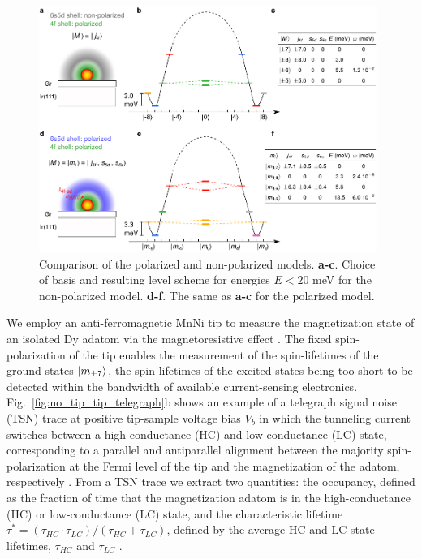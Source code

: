 \documentclass[
reprint,amsmath,amssymb,aps]{revtex4-2}
\begin{document}
\begin{figure}[ht!]
\includegraphics[width=0.98\textwidth]{Fig1_new.pdf}
\caption{Comparison of the polarized and non-polarized models. \textbf{a-c}. Choice of basis and resulting level scheme for energies $E<20$ meV for the non-polarized model. \textbf{d-f}. The same as \textbf{a-c} for the polarized model. 
\label{fig:intra} }
\end{figure}

We employ an anti-ferromagnetic MnNi tip to measure the magnetization state of an isolated Dy adatom via the magnetoresistive effect \cite{wiesendanger_ObservationVacuumTunneling_1990,Khajetoorians2013,paul_ControlMillisecondSpin_2017,Natterer2017,Natterer2018}. The fixed spin-polarization of the tip enables the measurement of the spin-lifetimes of the ground-states $\ket{m_{\pm7}}$, the spin-lifetimes of the excited states being too short to be detected within the bandwidth of available current-sensing electronics. Fig.~\ref{fig:no_tip_tip_telegraph}b shows an example of a telegraph signal noise (TSN) trace at positive tip-sample voltage bias $V_b$ in which the tunneling current switches between a high-conductance (HC) and low-conductance (LC) state, corresponding to a parallel and antiparallel alignment between the majority spin-polarization at the Fermi level of the tip and the magnetization of the adatom, respectively \cite{delgado2010,paul_ControlMillisecondSpin_2017}. From a TSN trace we extract two quantities: the occupancy, defined as the fraction of time that the magnetization adatom is in the high-conductance (HC) or low-conductance (LC) state, and the characteristic lifetime $\tau ^*=(\tau_{HC}  \cdot \tau_{LC})/( \tau_{HC} + \tau_{LC})$, defined by the average HC and LC state lifetimes, $ \tau_{HC}$ and  $\tau_{LC}$ \cite{Khajetoorians2013}. 
\end{document}
